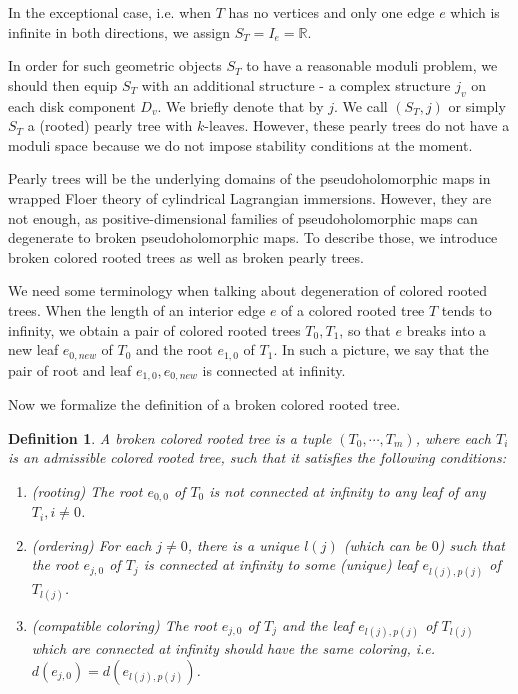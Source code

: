 \documentclass{amsart}
\newtheorem{definition}[theorem]{Definition}
\numberwithin{equation}{section}
\numberwithin{figure}{section}
\begin{document}
	In the exceptional case, i.e. when $T$ has no vertices and only one edge $e$ which is infinite in both directions, we assign $S_{T} = I_{e} = \mathbb{R}$. \par
	In order for such geometric objects $S_{T}$ to have a reasonable moduli problem, we should then equip $S_{T}$ with an additional structure - a complex structure $j_{v}$ on each disk component $D_{v}$. We briefly denote that by $j$. We call $(S_{T}, j)$ or simply $S_{T}$ a (rooted) pearly tree with $k$-leaves. However, these pearly trees do not have a moduli space because we do not impose stability conditions at the moment. \par
	Pearly trees will be the underlying domains of the pseudoholomorphic maps in wrapped Floer theory of cylindrical Lagrangian immersions. However, they are not enough, as positive-dimensional families of pseudoholomorphic maps can degenerate to broken pseudoholomorphic maps. To describe those, we introduce broken colored rooted trees as well as broken pearly trees. \par
	We need some terminology when talking about degeneration of colored rooted trees. When the length of an interior edge $e$ of a colored rooted tree $T$ tends to infinity, we obtain a pair of colored rooted trees $T_{0}, T_{1}$, so that $e$ breaks into a new leaf $e_{0, new}$ of $T_{0}$ and the root $e_{1, 0}$ of $T_{1}$. In such a picture, we say that the pair of root and leaf $e_{1, 0}, e_{0, new}$ is connected at infinity. \par
	Now we formalize the definition of a broken colored rooted tree. \par

\begin{definition}
	A broken colored rooted tree is a tuple $(T_{0}, \cdots, T_{m})$, where each $T_{i}$ is an admissible colored rooted tree, such that it satisfies the following conditions:
\begin{enumerate}[label=(\roman*)]

\item (rooting) The root $e_{0, 0}$ of $T_{0}$ is not connected at infinity to any leaf of any $T_{i}, i \neq 0$.

\item (ordering) For each $j \neq 0$, there is a unique $l(j)$ (which can be $0$) such that the root $e_{j, 0}$ of $T_{j}$ is connected at infinity to some (unique) leaf $e_{l(j), p(j)}$ of $T_{l(j)}$.

\item (compatible coloring) The root $e_{j, 0}$ of $T_{j}$ and the leaf $e_{l(j), p(j)}$ of $T_{l(j)}$ which are connected at infinity should have the same coloring, i.e. $d(e_{j, 0}) = d(e_{l(j), p(j)})$.

\end{enumerate}
\end{definition}
\end{document}
